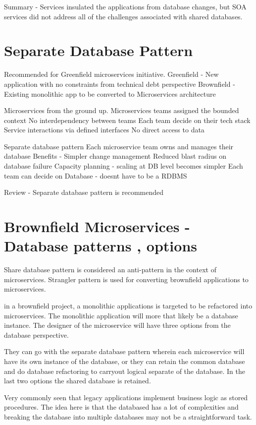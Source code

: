\documentclass[a4paper, 11pt]{book}
\begin{document}
    Summary
    - Services insulated the applications from database changes, but SOA services did not address all of the challenges associated with shared databases.


    \section{Separate Database Pattern}
    Recommended for Greenfield microservices initiative.
    Greenfield - New application with no constraints from technical debt perspective
    Brownfield - Existing monolithic app to be converted to Microservices architecture

    Microservices from the ground up.
    Microservices teams assigned the bounded context
    No interdependency between teams
    Each team decide on their tech stack
    Service interactions via defined interfaces
    No direct access to data

    Separate database pattern
    Each microservice team owns and manages their database
    Benefits - Simpler change management
    Reduced blast radius on database failure
    Capacity planning - scaling at DB level becomes simpler
    Each team can decide on Database - doesnt have to be a RDBMS

    Review
    - Separate database pattern is recommended


    \section{Brownfield Microservices - Database patterns , options}
    Share database pattern is considered an anti-pattern in the context of microservices.
    Strangler pattern is used for converting brownfield applications to microservices.

    in a brownfield project, a monolithic applications is targeted to be refactored into microservices.
    The monolithic application will more that likely be a database instance.
    The designer of the microservice will have three options from the database perspective.

    They can go with the separate database pattern wherein each microservice will have its own instance of the database, or they can retain the common database and do database refactoring to carryout logical separate of the database.
    In the last two options the shared database is retained.

    Very commonly seen that legacy applications implement business logic as stored procedures.
    The idea here is that the databased has a lot of complexities and breaking the database into multiple databases may not be a straightforward task.
\end{document}
